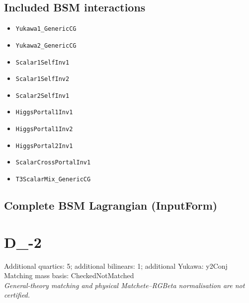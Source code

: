 \documentclass[10pt,a4paper]{article}
\begin{document}
\subsection*{Included BSM interactions}
\begin{itemize}
\item \texttt{Yukawa1\_GenericCG}
\item \texttt{Yukawa2\_GenericCG}
\item \texttt{Scalar1SelfInv1}
\item \texttt{Scalar1SelfInv2}
\item \texttt{Scalar2SelfInv1}
\item \texttt{HiggsPortal1Inv1}
\item \texttt{HiggsPortal1Inv2}
\item \texttt{HiggsPortal2Inv1}
\item \texttt{ScalarCrossPortalInv1}
\item \texttt{T3ScalarMix\_GenericCG}
\end{itemize}
\subsection*{Complete BSM Lagrangian (InputForm)}

\clearpage
\section{D\_-2}
Additional quartics: 5; additional bilinears: 1; additional Yukawa: y2Conj\\
Matching mass basis: CheckedNotMatched\\
\emph{General-theory matching and physical Matchete--RGBeta normalisation are not certified.}
\end{document}
